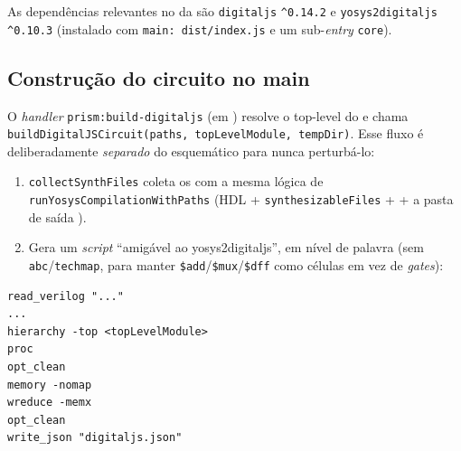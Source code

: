 As dependências relevantes no  da  são
\lstinline|digitaljs| \lstinline|^0.14.2| e \lstinline|yosys2digitaljs|
\lstinline|^0.10.3| (instalado com \lstinline|main: dist/index.js| e um
sub-\emph{entry} \lstinline|core|).

\subsection{Construção do circuito no main}

O \emph{handler} \lstinline|prism:build-digitaljs| (em )
resolve o top-level do  e chama
\lstinline|buildDigitalJSCircuit(paths, topLevelModule, tempDir)|. Esse fluxo é
deliberadamente \emph{separado} do esquemático para nunca perturbá-lo:

\begin{enumerate}[leftmargin=2.2em]
  \item \lstinline|collectSynthFiles| coleta os  com a mesma lógica de
        \lstinline|runYosysCompilationWithPaths| (HDL + \lstinline|synthesizableFiles|
        +  + a pasta de saída ).
  \item Gera um \emph{script}  \enquote{amigável ao
        yosys2digitaljs}, em nível de palavra (sem \lstinline|abc|/\lstinline|techmap|,
        para manter \lstinline|$add|/\lstinline|$mux|/\lstinline|$dff| como
        células  em vez de \emph{gates}):
\end{enumerate}

\begin{lstlisting}[caption={Script Yosys da simulação (buildDigitalJSCircuit)}]
read_verilog "..."
...
hierarchy -top <topLevelModule>
proc
opt_clean
memory -nomap
wreduce -memx
opt_clean
write_json "digitaljs.json"
\end{lstlisting}

